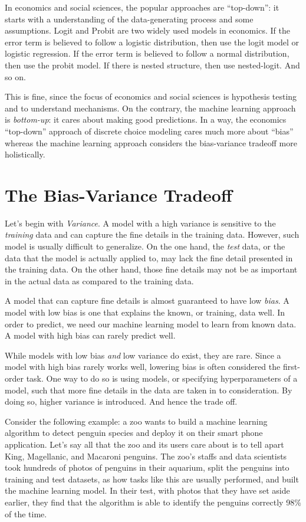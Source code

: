 \documentclass[
]{book}
\theoremstyle{definition}
\theoremstyle{definition}
\theoremstyle{definition}
\theoremstyle{definition}
\theoremstyle{remark}
\begin{document}
In economics and social sciences, the popular approaches are ``top-down'': it starts with a understanding of the data-generating process and some assumptions. Logit and Probit are two widely used models in economics. If the error term is believed to follow a logistic distribution, then use the logit model or logistic regression. If the error term is believed to follow a normal distribution, then use the probit model. If there is nested structure, then use nested-logit. And so on.

This is fine, since the focus of economics and social sciences is hypothesis testing and to understand mechanisms. On the contrary, the machine learning approach is \emph{bottom-up}: it cares about making good predictions. In a way, the economics ``top-down'' approach of discrete choice modeling cares much more about ``bias'' whereas the machine learning approach considers the bias-variance tradeoff more holistically.

\hypertarget{the-bias-variance-tradeoff}{%
\section{The Bias-Variance Tradeoff}\label{the-bias-variance-tradeoff}}

Let's begin with \emph{Variance}. A model with a high variance is sensitive to the \emph{training} data and can capture the fine details in the training data. However, such model is usually difficult to generalize. On the one hand, the \emph{test} data, or the data that the model is actually applied to, may lack the fine detail presented in the training data. On the other hand, those fine details may not be as important in the actual data as compared to the training data.

A model that can capture fine details is almost guaranteed to have low \emph{bias}. A model with low bias is one that explains the known, or training, data well. In order to predict, we need our machine learning model to learn from known data. A model with high bias can rarely predict well.

While models with low bias \emph{and} low variance do exist, they are rare. Since a model with high bias rarely works well, lowering bias is often considered the first-order task. One way to do so is using models, or specifying hyperparameters of a model, such that more fine details in the data are taken in to consideration. By doing so, higher variance is introduced. And hence the trade off.

Consider the following example: a zoo wants to build a machine learning algorithm to detect penguin species and deploy it on their smart phone application. Let's say all that the zoo and its users care about is to tell apart King, Magellanic, and Macaroni penguins. The zoo's staffs and data scientists took hundreds of photos of penguins in their aquarium, split the penguins into training and test datasets, as how tasks like this are usually performed, and built the machine learning model. In their test, with photos that they have set aside earlier, they find that the algorithm is able to identify the penguins correctly 98\% of the time.
\end{document}
